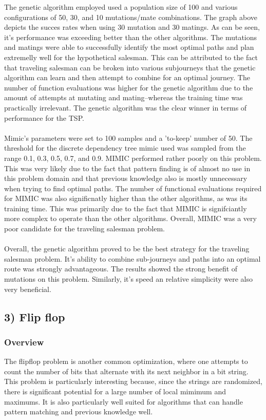 \documentclass[h]{article}
\begin{document}
The genetic algorithm employed used a population size of 100 and various 
configurations of 50, 30, and 10 mutations/mate combinations.  The graph above 
depicts the succes rates when using 30 mutation and 30 matings.  As can be seen, 
it's performance was exceeding better than the other algorithms.  The mutations and matings were able to successfully 
identify the most optimal paths and plan extremelly well for the hypothetical salesman.  This can be attributed to 
the fact that traveling salesman can be broken into various subjourneys that the 
genetic algorithm can learn and then attempt to combine for an optimal journey.  The number of function  evaluations was higher for the genetic algorithm due to the amount of attempts 
at mutating and mating--whereas the training time was practically irrelevant.  
The genetic algorithm was the clear winner in terms of performance for the TSP.
\\ \\
Mimic's parameters were set to 100 samples and a 'to-keep' number of 50.  
The threshold for the discrete dependency tree mimic used was sampled from the 
range 0.1, 0.3, 0.5, 0.7, and 0.9.  MIMIC performed rather poorly on this problem.  This was very likely due to the fact that pattern finding is of almost no use in this 
problem domain and that previous knowledge also is mostly unnecessary when trying to find optimal paths.  The number of functional 
evaluations required for MIMIC was also significnatly higher than the other 
algorithms, as was its training time.  This was primarily due to the fact that 
MIMIC is signifciantly more complex to operate than the other algorithms.  
Overall, MIMIC was a very poor candidate for the traveling salesman problem.
\\ \\
Overall, the genetic algorithm proved to be the best strategy for the traveling salesman problem.  It's ability to combine 
sub-journeys and paths into an optimal route was strongly advantageous.  The results showed the strong benefit of mutations on this 
problem.  Similarly, it's speed an relative simplicity were also very 
beneficial.

\subsection*{3) Flip flop}  
\subsubsection*{Overview}
The flipflop problem is another common optimization, where one attempts to 
count the number of bits that alternate with its next neighbor in a bit string.  
This problem is particularly interesting because, since the strings are 
randomized, there is significant potential for a large number of local mimimum 
and maximums.  It is also particularly well suited for algorithms that can 
handle pattern matching  and previous knowledge well.  
\\ \\
\end{document}
